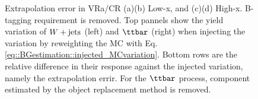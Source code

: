 \begin{figure}[h]
  \centering

 \caption{Extrapolation error in VRa/CR (a)(b) Low-x, and (c)(d) High-x. B-tagging requirement is removed. Top pannels show the yield variation of $W+\mathrm{jets}$ (left) and $\ttbar$ (right) when injecting the variation by reweighting the MC with Eq. \ref{eq::BGestimation::injected_MCvariation}. Bottom rows are the relative difference in their response against the injected variation, namely the extrapolation errir. For the $\ttbar$ process, component estimated by the object replacement method is removed.  \label{fig::BGestimation::valid_extp_VRa6J} }
\end{figure}



